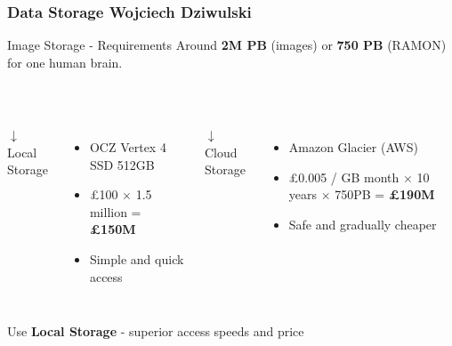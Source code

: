 \documentclass[10pt]{beamer}
\begin{document}
\begin{frame}[fragile]
  \frametitle{Data Storage  \hspace{0pt plus 1 filll} \small{Wojciech Dziwulski}}

  

      \begin{block}{Image Storage - Requirements}
        Around \textbf{2M PB} (images) or \textbf{750 PB} (RAMON) for one human brain.
      \end{block}
     
      $ $
      
      \begin{columns}[T,onlytextwidth]
      	\centering
      	$\downarrow$ \\
      	\alert{Local Storage}
      	
        \begin{itemize}[label={$\bullet$}]
        \item OCZ Vertex 4 SSD 512GB
        \item \pounds 100 $\times$ 1.5 million = \textbf{\pounds 150M}
        \item Simple and quick access
        \end{itemize}
      	
      	\centering
      	$\downarrow$ \\
      	\alert{Cloud Storage}
      	
      	\begin{itemize}[label={$\bullet$}]
	    \item Amazon Glacier (AWS)
	    \item \pounds 0.005 / GB month $\times$ 10 years $\times$ 750PB  = \textbf{\pounds 190M}
	    \item Safe and gradually cheaper
        \end{itemize}
      	
      \end{columns}
      
      \begin{center}
      Use \textbf{Local Storage} - superior access speeds and price
      \end{center}
      
\end{frame}
\end{document}
